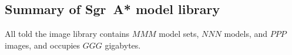 
\subsection{Summary of Sgr~A* model library}

All told the image library contains $MMM$ model sets, $NNN$ models, and $PPP$ images, and occupies $GGG$ gigabytes.


\pagebreak

